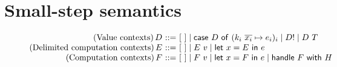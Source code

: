 \documentclass[preprint]{sigplanconf}
\makeatletter
\newcommand{\many}{\overline}
\newcommand\ba{\begin{array}}
\newcommand\ea{\end{array}}
\newenvironment{equations}{\[\ba{@{}r@{~}c@{~}l@{}}}{\ea\]}
\newcommand{\key}[1]{\mathsf{#1}}
\newcommand{\handleSymbol}{\mathbin{?}}
\newcommand{\handle}[2]{{#1} \handleSymbol {#2}}
\newcommand{\force}[1]{{#1}!}
\makeatother
\begin{document}
\section{Small-step semantics}

\newcommand{\reducesto}{\longrightarrow}

\begin{figure*}

\begin{equations}
(\textrm{Value contexts})\, D
  &::=& [~] \mid \key{case}~D~\key{of}~(k_i~\many{x_i} \mapsto e_i)_i \mid \force{D} \mid D~T \\
(\textrm{Delimited computation contexts})\, E
  &::=& [~] \mid E~v \mid \key{let}~x=E~\key{in}~e \\
(\textrm{Computation contexts})\, F
  &::=& [~] \mid F~v \mid \key{let}~x=F~\key{in}~e
            \mid \key{handle}~F~\key{with}~H \\
\end{equations}%


\end{figure*}
\end{document}
